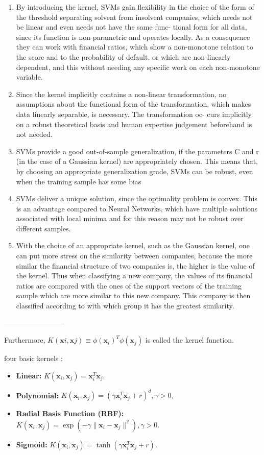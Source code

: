 \begin{enumerate}
\item By introducing the kernel, SVMs gain flexibility in the choice of the form of the threshold separating solvent from insolvent companies, which needs not be linear and even needs not have the same func- tional form for all data, since its function is non-parametric and operates locally. As a consequence they can work with financial ratios, which show a non-monotone relation to the score and to the probability of default, or which are non-linearly dependent, and this without needing any specific work on each non-monotone variable.
\item Since the kernel implicitly contains a non-linear transformation, no assumptions about the functional form of the transformation, which makes data linearly separable, is necessary. The transformation oc- curs implicitly on a robust theoretical basis and human expertise judgement beforehand is not needed.
\item SVMs provide a good out-of-sample generalization, if the parameters C and r (in the case of a Gaussian kernel) are appropriately chosen. This means that, by choosing an appropriate generalization grade, SVMs can be robust, even when the training sample has some bias
\item SVMs deliver a unique solution, since the optimality problem is convex. This is an advantage compared to Neural Networks, which have multiple solutions associated with local minima and for this reason may not be robust over different samples.
\item With the choice of an appropriate kernel, such as the Gaussian kernel, one can put more stress on the similarity between companies, because the more similar the financial structure of two companies is, the higher is the value of the kernel. Thus when classifying a new company, the values of its financial ratios are compared with the ones of the support vectors of the training sample which are more similar to this new company. This company is then classified according to with which group it has the greatest similarity.
\end{enumerate}

--------------------------

Furthermore, $K(\bm{x}i, \bm{x}j ) \equiv \phi(\bm{x}_i)^T \phi(\bm{x}_j)$ is called the kernel function.

four basic kernels \cite{hsu2003practical}:

\begin{itemize}
\item \textbf{Linear:} $K(\bm{x}_i,\bm{x}_j) = \bm{x}^T_i \bm{x}_j$.
\item \textbf{Polynomial:} $K(\bm{x}_i,\bm{x}_j) = (\gamma \bm{x}^T_i \bm{x}_j + r)^d, \gamma > 0$.
\item \textbf{Radial Basis Function (RBF):} $K(\bm{x}_i,\bm{x}_j) = \exp(−\gamma \lVert \bm{x}_i − \bm{x}_j \rVert ^2),\gamma > 0$.
\item \textbf{Sigmoid:} $K(\bm{x}_i,\bm{x}_j) = \tanh(\gamma \bm{x}^T_i\bm{x}_j + r)$.
\end{itemize}

